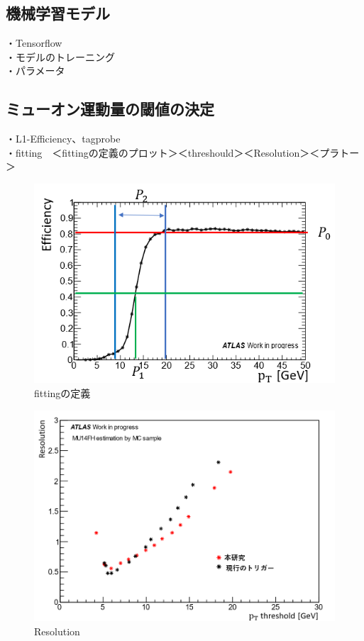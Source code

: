 \subsection{機械学習モデル}
・Tensorflow\\
・モデルのトレーニング\\
・パラメータ


\subsection{ミューオン運動量の閾値の決定}
・L1-Efficiency、tagprobe\\
・fitting　＜fittingの定義のプロット＞＜threshould＞＜Resolution＞＜プラトー＞\\
\begin{figure}[tb]
  \centering
  \includegraphics[clip, width=14cm]{fig/4/fitting_def.png}
  \caption{fittingの定義}
  \label{fig:fit_def}
\end{figure}

\begin{figure}[tb]
  \centering
  \includegraphics[clip, width=14cm]{fig/4/resolution_v07_v05.png}
  \caption{Resolution}
  \label{fig:Resolution}
\end{figure}

